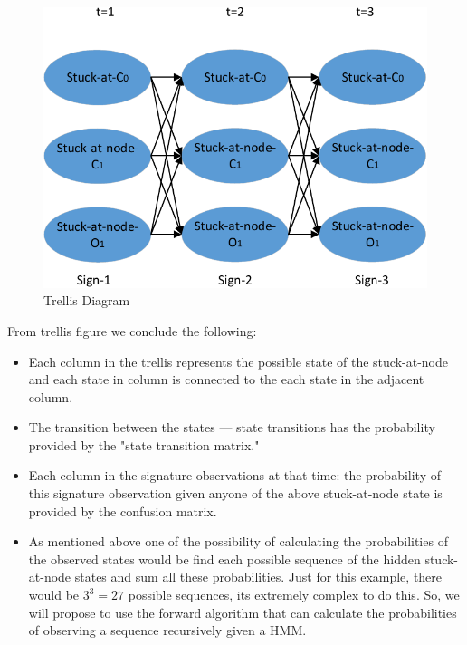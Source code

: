 \begin{figure}[tb!]

 \centering
  \captionsetup{justification=centering}    
   \includegraphics[scale=0.8]{Figures/trellis.pdf}
   \caption{Trellis Diagram}
\label{fig:trellis}
\end{figure}


From trellis figure we conclude the following:

\begin{itemize}

\item Each column in the trellis represents the possible state of the stuck-at-node and each state in column is connected to the each state in the adjacent column.

\item The transition between the states --- state transitions has the probability provided by the "state transition matrix."

\item Each column in the signature observations at that time: the probability of this signature observation given anyone of the above stuck-at-node state is provided by the confusion matrix. 

\item As mentioned above one of the possibility of calculating the probabilities of the observed states would be find each possible sequence of the hidden stuck-at-node states and sum all these probabilities. Just for this example, there would be $3^3 = 27$ possible sequences, its extremely complex to do this. So, we will propose to use the forward algorithm that can calculate the probabilities of observing a sequence recursively given a HMM.

\end{itemize}


